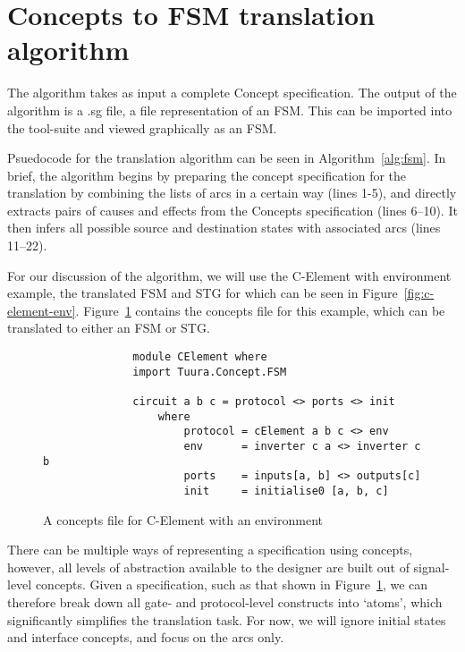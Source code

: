 \section{Concepts to FSM translation algorithm}\label{sec:algorithm}

The algorithm takes as input a complete Concept specification.
The output of the algorithm is a .sg file, a file representation of an FSM.
This can be imported into the  tool-suite and viewed graphically as an FSM\@.

Psuedocode for the translation algorithm can be seen in Algorithm~\ref{alg:fsm}.
In brief, the algorithm begins by preparing the concept specification for the translation by combining the lists of arcs in a certain way (lines 1-5), 
and directly extracts pairs of causes and effects from the Concepts specification (lines 6--10).
It then infers all possible source and destination states with associated arcs (lines 11--22).

For our discussion of the algorithm, we will use the C-Element with environment 
example, the translated FSM and STG for which can be seen in 
Figure~\ref{fig:c-element-env}. Figure~\ref{fig:concepts_file} contains the 
concepts file for this example, which can be translated to either an FSM or STG. 

\begin{figure}[H]
	\centering
		\begin{verbatim}
        	  module CElement where
        	  import Tuura.Concept.FSM

        	  circuit a b c = protocol <> ports <> init 
            	  where
                	  protocol = cElement a b c <> env
                	  env      = inverter c a <> inverter c b
                	  ports    = inputs[a, b] <> outputs[c] 
                	  init     = initialise0 [a, b, c]
		\end{verbatim}
	\vspace{-5mm}
	\begin{centering}
		\protect\caption{\label{fig:concepts_file}A concepts file for C-Element with an environment}
		\par\end{centering}
	
\end{figure}

There can be multiple ways of representing a specification using concepts, 
however, all levels of abstraction available to the designer are built out of signal-level
concepts. Given a specification, such as that shown in Figure~\ref{fig:concepts_file}, we can 
therefore break down 
all gate- and protocol-level constructs into `atoms', which significantly 
simplifies the translation task. For now, we will ignore initial states and interface
concepts, and focus on the arcs only.


